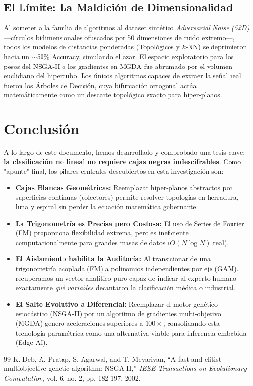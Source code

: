 \documentclass[10pt,twocolumn,letterpaper]{article}
\begin{document}
\subsection{El Límite: La Maldición de Dimensionalidad}
Al someter a la familia de algoritmos al dataset sintético \textit{Adversarial Noise (52D)} —círculos bidimensionales ofuscados por 50 dimensiones de ruido extremo—, todos los modelos de distancias ponderadas (Topológicos y $k$-NN) se deprimieron hacia un $\sim$50\% Accuracy, simulando el azar. El espacio exploratorio para los pesos del NSGA-II o los gradientes en MGDA fue abrumado por el volumen euclidiano del hipercubo. Los únicos algoritmos capaces de extraer la señal real fueron los Árboles de Decisión, cuya bifurcación ortogonal actúa matemáticamente como un descarte topológico exacto para hiper-planos.

\section{Conclusión}
A lo largo de este documento, hemos desarrollado y comprobado una tesis clave: \textbf{la clasificación no lineal no requiere cajas negras indescifrables}. Como "apunte" final, los pilares centrales descubiertos en esta investigación son:
\begin{itemize}
    \item \textbf{Cajas Blancas Geométricas:} Reemplazar hiper-planos abstractos por superficies continuas (colectores) permite resolver topologías en herradura, luna y espiral sin perder la ecuación matemática gobernante.
    \item \textbf{La Trigonometría es Precisa pero Costosa:} El uso de Series de Fourier (FM) proporciona flexibilidad extrema, pero es ineficiente computacionalmente para grandes masas de datos ($O(N \log N)$ real).
    \item \textbf{El Aislamiento habilita la Auditoría:} Al transicionar de una trigonometría acoplada (FM) a polinomios independientes por eje (GAM), recuperamos un vector analítico puro capaz de indicar al experto humano exactamente \textit{qué variables} decantaron la clasificación médica o industrial.
    \item \textbf{El Salto Evolutivo a Diferencial:} Reemplazar el motor genético estocástico (NSGA-II) por un algoritmo de gradientes multi-objetivo (MGDA) generó aceleraciones superiores a $100\times$, consolidando esta tecnología paramétrica como una alternativa viable para inferencia embebida (Edge AI).
\end{itemize}

\begin{thebibliography}{99}
K. Deb, A. Pratap, S. Agarwal, and T. Meyarivan, ``A fast and elitist multiobjective genetic algorithm: NSGA-II,'' \textit{IEEE Transactions on Evolutionary Computation}, vol. 6, no. 2, pp. 182-197, 2002.
\end{thebibliography}
\end{document}
